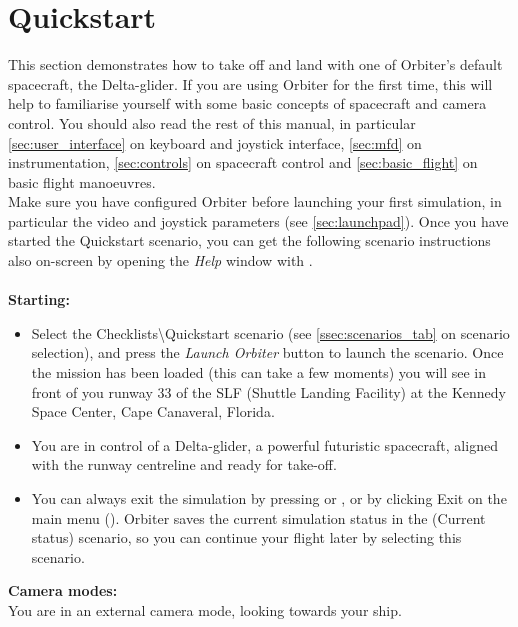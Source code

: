 \documentclass[Orbiter User Manual.tex]{subfiles}
\begin{document}
\section{Quickstart}
\label{sec:quickstart}
This section demonstrates how to take off and land with one of Orbiter's default spacecraft, the Delta-glider. If you are using Orbiter for the first time, this will help to familiarise yourself with some basic concepts of spacecraft and camera control. You should also read the rest of this manual, in particular \ref{sec:user_interface} on keyboard and joystick interface, \ref{sec:mfd} on instrumentation, \ref{sec:controls} on spacecraft control and \ref{sec:basic_flight} on basic flight manoeuvres.\\
Make sure you have configured Orbiter before launching your first simulation, in particular the video and joystick parameters (see \ref{sec:launchpad}). Once you have started the Quickstart scenario, you can get the following scenario instructions also on-screen by opening the \textit{Help} window with \Alt{}.\\
\\
\textbf{Starting:}

\begin{itemize}
\item Select the Checklists\textbackslash Quickstart scenario (see \ref{ssec:scenarios_tab} on scenario selection), and press the \textit{Launch Orbiter} button to launch the scenario. Once the mission has been loaded (this can take a few moments) you will see in front of you runway 33 of the SLF (Shuttle Landing Facility) at the Kennedy Space Center, Cape Canaveral, Florida.
\item You are in control of a Delta-glider, a powerful futuristic spacecraft, aligned with the runway centreline and ready for take-off.
\item You can always exit the simulation by pressing \Ctrl{} or \Alt{}, or by clicking Exit on the main menu (). Orbiter saves the current simulation status in the (Current status) scenario, so you can continue your flight later by selecting this scenario.
\end{itemize}

\noindent
\textbf{Camera modes:}\\
You are in an external camera mode, looking towards your ship.
\end{document}

